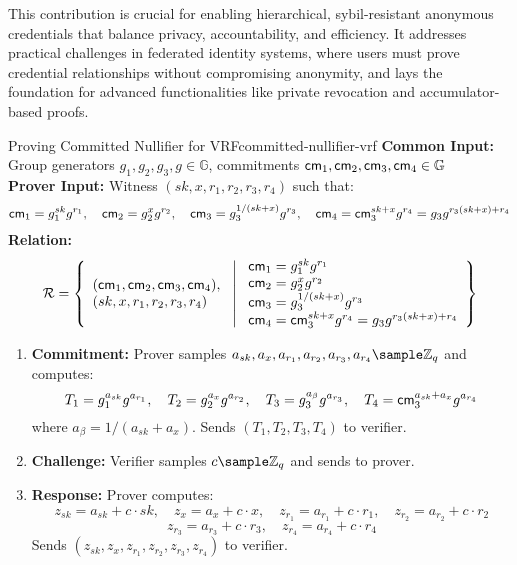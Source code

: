 This contribution is crucial for enabling hierarchical, sybil-resistant anonymous credentials that balance privacy, accountability, and efficiency. It addresses practical challenges in federated identity systems, where users must prove credential relationships without compromising anonymity, and lays the foundation for advanced functionalities like private revocation and accumulator-based proofs.

\begin{protocol}{Proving Committed Nullifier for VRF}{committed-nullifier-vrf}\label{pok-committed-nullifier-vrf}
\textbf{Common Input:} Group generators $g_1, g_2, g_3, g \in \mathbb{G}$, commitments $\mathsf{cm}_1, \mathsf{cm}_2, \mathsf{cm}_3, \mathsf{cm}_4 \in \mathbb{G}$ \\
\textbf{Prover Input:} Witness $(sk, x, r_1, r_2, r_3, r_4)$ such that:
    \[
    \mathsf{cm}_1 = g_1^{sk} g^{r_1}, \quad \mathsf{cm}_2 = g_2^{x} g^{r_2}, \quad \mathsf{cm}_3 = g_3^{1/(sk + x)} g^{r_3}, \quad \mathsf{cm}_4 = \mathsf{cm}_3^{sk + x} g^{r_4} = g_3 g^{r_3 (sk + x) + r_4}
    \]
\textbf{Relation:}
\[
\mathcal{R} = \left\{ 
\begin{array}{l} 
(\mathsf{cm}_1, \mathsf{cm}_2, \mathsf{cm}_3, \mathsf{cm}_4), \\
(sk, x, r_1, r_2, r_3, r_4) 
\end{array}
\ \middle| \
\begin{array}{l}
\mathsf{cm}_1 = g_1^{sk} g^{r_1} \\
\mathsf{cm}_2 = g_2^{x} g^{r_2} \\
\mathsf{cm}_3 = g_3^{1/(sk + x)} g^{r_3} \\
\mathsf{cm}_4 = \mathsf{cm}_3^{sk + x} g^{r_4} = g_3 g^{r_3 (sk + x) + r_4}
\end{array} \right\}
\]
\begin{enumerate}
    \item \textbf{Commitment:} Prover samples $a_{sk}, a_x, a_{r_1}, a_{r_2}, a_{r_3}, a_{r_4} \sample \mathbb{Z}_q$ and computes:
       \[
       T_1 = g_1^{a_{sk}} g^{a_{r_1}}, \quad T_2 = g_2^{a_x} g^{a_{r_2}}, \quad T_3 = g_3^{a_{\beta}} g^{a_{r_3}}, \quad T_4 = \mathsf{cm}_3^{a_{sk} + a_x} g^{a_{r_4}}
       \]
       where $a_{\beta} = 1/(a_{sk} + a_x)$. Sends $(T_1, T_2, T_3, T_4)$ to verifier.
    
    \item \textbf{Challenge:} Verifier samples $c \sample \mathbb{Z}_q$ and sends to prover.
    
    \item \textbf{Response:} Prover computes:
       \[
       z_{sk} = a_{sk} + c \cdot sk, \quad z_x = a_x + c \cdot x, \quad z_{r_1} = a_{r_1} + c \cdot r_1, \quad z_{r_2} = a_{r_2} + c \cdot r_2
       \]
       \[
       z_{r_3} = a_{r_3} + c \cdot r_3, \quad z_{r_4} = a_{r_4} + c \cdot r_4
       \]
       Sends $(z_{sk}, z_x, z_{r_1}, z_{r_2}, z_{r_3}, z_{r_4})$ to verifier.
    

\end{enumerate}
\end{protocol}
